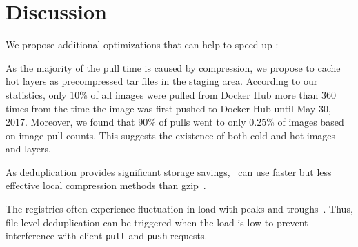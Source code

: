 \section{Discussion}

We propose additional optimizations that can help to speed up \sysname:

\begin{compactenumerate}
%
\item
%
As the majority of the pull time is caused by compression, we propose to cache
hot layers as precompressed tar files in the staging area.
%
%
%
According to our statistics, only 10\% of all images were pulled
from Docker Hub more than 360 times from the time the image was first pushed to Docker Hub
until May 30, 2017. Moreover, we found that 90\% of pulls
went to only 0.25\% of images based on image pull counts.
%
This suggests the existence of both cold and hot images and layers.
%
%
%
%
%
%
%

\item
%
As deduplication provides significant storage savings, \sysname\ can use faster
but less effective local compression methods than gzip~\cite{lz4}.
%

\item
%
%
The registries often experience fluctuation in load with peaks and
troughs~\cite{dockerworkload}.
%
Thus, file-level deduplication can be triggered
when the load is low to prevent interference with 
client \texttt{pull} and \texttt{push} requests.
%
%
%
\end{compactenumerate}

